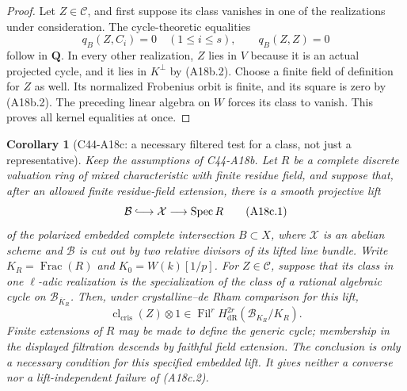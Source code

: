 \documentclass[11pt]{article}
\newtheorem{corollary}[theorem]{Corollary}
\theoremstyle{remark}\newtheorem{remark}[theorem]{Remark}
\begin{document}
\begin{proof}
Let $Z\in\mathscr C$, and first suppose its class vanishes in one
of the realizations under consideration. The cycle-theoretic
equalities
\[
                  q_B(Z,C_i)=0\quad(1\leq i\leq s),
                  \qquad q_B(Z,Z)=0
 \tag{A18b.2}
\]
follow in $\mathbf Q$. In every other realization, $Z$ lies in
$V$ because it is an actual projected cycle, and it lies in
$K^\perp$ by (A18b.2). Choose a finite field of definition for $Z$
as well. Its normalized Frobenius orbit is finite, and its square
is zero by (A18b.2). The preceding linear algebra on $W$ forces
its class to vanish. This proves all kernel equalities at once.
\end{proof}

\begin{corollary}[C44-A18c: a necessary filtered test for a class, not just a representative]
Keep the assumptions of C44-A18b. Let $R$ be a complete discrete
valuation ring of mixed characteristic with finite residue field,
and suppose that, after an allowed finite residue-field extension,
there is a smooth projective lift
\[
          \mathcal B\lhook\joinrel\longrightarrow\mathcal X
                       \longrightarrow\operatorname{Spec}R
 \tag{A18c.1}
\]
of the polarized embedded complete intersection $B\subset X$,
where $\mathcal X$ is an abelian scheme and $\mathcal B$ is cut
out by two relative divisors of its lifted line bundle. Write
$K_R=\operatorname{Frac}(R)$ and $K_0=W(k)[1/p]$. For
$Z\in\mathscr C$, suppose that its class in one $\ell$-adic
realization is the specialization of the class of a rational
algebraic cycle on $\mathcal B_{\overline K_R}$. Then, under
crystalline--de Rham comparison for this lift,
\[
 \operatorname{cl}_{\mathrm{cris}}(Z)\otimes1
       \in \operatorname{Fil}^r
                H^{2r}_{\mathrm{dR}}(\mathcal B_{K_R}/K_R).
 \tag{A18c.2}
\]
Finite extensions of $R$ may be made to define the generic cycle;
membership in the displayed filtration descends by faithful
field extension. The conclusion is only a necessary condition
for this specified embedded lift. It gives neither a converse
nor a lift-independent failure of (A18c.2).
\end{corollary}
\end{document}
